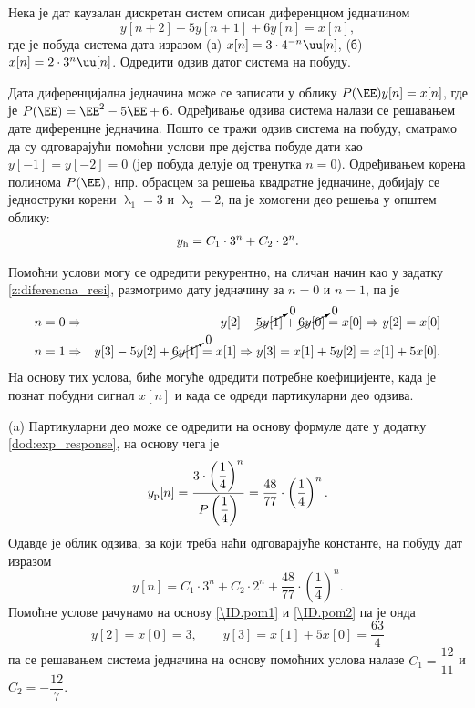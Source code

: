 \PID
Нека је дат каузалан дискретан систем описан диференцном једначином 
$$y[n+2] - 5 y[n+1] + 6 y[n] = x[n],$$ где је побуда система 
дата изразом (а) $x[n] = 3\cdot 4^{-n} \uu[n]$, (б) $x[n] = 2 \cdot 3^n \uu[n]$. Одредити одзив датог система на побуду.     

\RESENJE 
Дата диференцијална једначина може се записати у облику 
$P(\EE) y[n] = x[n]$, где је $P(\EE) = \EE^2 - 5\EE + 6$. 
Одређивање одзива система налази се решавањем дате диференцне једначина. Пошто се тражи одзив система на побуду, 
сматрамо да су одговарајући помоћни услови пре дејства побуде дати као $y[-1] = y[-2] = 0$ (јер побуда делује од 
тренутка $n=0$). Одређивањем корена полинома $P(\EE)$, нпр. обрасцем за решења квадратне једначине, добијају се 
једноструки корени $\uplambda_1 = 3$ и $\uplambda_2 = 2$, па је хомогени део решења у општем облику:
\begin{eqnarray}
    y_{\rm h} = C_1 \cdot 3^n + C_2 \cdot 2^n.
\end{eqnarray}

Помоћни услови могу се одредити рекурентно, на сличан начин као у задатку \ref{z:diferencna_resi}, размотримо дату једначину за $n = 0$ и $n = 1$, па је 
\begin{eqnarray}
    n=0 &\Rightarrow& y[2] - \cancelto{0}{5 y[1]} + \cancelto{0}{6 y[0]} = x[0] \Rightarrow y[2] = x[0] \label{\ID.pom1}
    \\ 
    n=1 &\Rightarrow& y[3] - 5y[2] + \cancelto{0}{6y[1]} = x[1] \Rightarrow y[3] = x[1] + 5 y[2] = x[1] + 5 x[0]. \label{\ID.pom2}
\end{eqnarray}
На основу тих услова, биће могуће одредити потребне коефицијенте, када је познат побудни сигнал $x[n]$ и када се одреди партикуларни део одзива.



(a) Партикуларни део може се одредити на основу формуле дате у додатку \ref{dod:exp_response}, на основу чега је 
\begin{eqnarray}
    y_{\rm p}[n] = \dfrac{3 \cdot \left( \dfrac14 \right)^n }{ P\left( \dfrac14 \right) } = \dfrac{48}{77} \cdot \left( \dfrac14 \right)^n.
\end{eqnarray}
Одавде је облик одзива, за који треба наћи одговарајуће константе, на побуду дат изразом 
\begin{equation}
    y[n] = C_1 \cdot 3^n + C_2 \cdot 2^n +  \dfrac{48}{77} \cdot \left( \dfrac14 \right)^n.
\end{equation}
Помоћне услове рачунамо на основу \eqref{\ID.pom1} и \eqref{\ID.pom2} па је онда 
\begin{equation}
    y[2] = x[0] = 3, \qquad y[3] = x[1] + 5x[0] = \dfrac{63}{4}   
\end{equation}
па се решавањем система једначина на основу помоћних услова налазе $C_1 = \dfrac{12}{11}$ и $C_2 = -\dfrac{12}{7}$.

